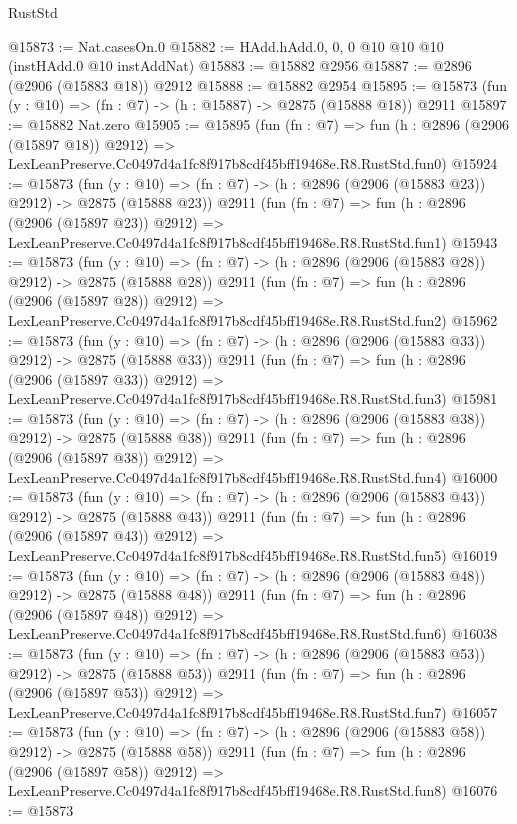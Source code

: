 \begin{lexlean}{RustStd}
\begin{coremodule}
@15873 := Nat.casesOn.{0}
@15882 := HAdd.hAdd.{0, 0, 0} @10 @10 @10 (instHAdd.{0} @10 instAddNat)
@15883 := @15882 @2956
@15887 := @2896 (@2906 (@15883 @18)) @2912
@15888 := @15882 @2954
@15895 := @15873 (fun (y : @10) => (fn : @7) -> (h : @15887) -> @2875 (@15888 @18)) @2911
@15897 := @15882 Nat.zero
@15905 := @15895
    (fun (fn : @7) =>
    fun (h : @2896 (@2906 (@15897 @18)) @2912) =>
    LexLeanPreserve.Cc0497d4a1fc8f917b8cdf45bff19468e.R8.RustStd.fun0)
@15924 := @15873
    (fun (y : @10) => (fn : @7) -> (h : @2896 (@2906 (@15883 @23)) @2912) -> @2875 (@15888 @23))
    @2911
    (fun (fn : @7) =>
    fun (h : @2896 (@2906 (@15897 @23)) @2912) =>
    LexLeanPreserve.Cc0497d4a1fc8f917b8cdf45bff19468e.R8.RustStd.fun1)
@15943 := @15873
    (fun (y : @10) => (fn : @7) -> (h : @2896 (@2906 (@15883 @28)) @2912) -> @2875 (@15888 @28))
    @2911
    (fun (fn : @7) =>
    fun (h : @2896 (@2906 (@15897 @28)) @2912) =>
    LexLeanPreserve.Cc0497d4a1fc8f917b8cdf45bff19468e.R8.RustStd.fun2)
@15962 := @15873
    (fun (y : @10) => (fn : @7) -> (h : @2896 (@2906 (@15883 @33)) @2912) -> @2875 (@15888 @33))
    @2911
    (fun (fn : @7) =>
    fun (h : @2896 (@2906 (@15897 @33)) @2912) =>
    LexLeanPreserve.Cc0497d4a1fc8f917b8cdf45bff19468e.R8.RustStd.fun3)
@15981 := @15873
    (fun (y : @10) => (fn : @7) -> (h : @2896 (@2906 (@15883 @38)) @2912) -> @2875 (@15888 @38))
    @2911
    (fun (fn : @7) =>
    fun (h : @2896 (@2906 (@15897 @38)) @2912) =>
    LexLeanPreserve.Cc0497d4a1fc8f917b8cdf45bff19468e.R8.RustStd.fun4)
@16000 := @15873
    (fun (y : @10) => (fn : @7) -> (h : @2896 (@2906 (@15883 @43)) @2912) -> @2875 (@15888 @43))
    @2911
    (fun (fn : @7) =>
    fun (h : @2896 (@2906 (@15897 @43)) @2912) =>
    LexLeanPreserve.Cc0497d4a1fc8f917b8cdf45bff19468e.R8.RustStd.fun5)
@16019 := @15873
    (fun (y : @10) => (fn : @7) -> (h : @2896 (@2906 (@15883 @48)) @2912) -> @2875 (@15888 @48))
    @2911
    (fun (fn : @7) =>
    fun (h : @2896 (@2906 (@15897 @48)) @2912) =>
    LexLeanPreserve.Cc0497d4a1fc8f917b8cdf45bff19468e.R8.RustStd.fun6)
@16038 := @15873
    (fun (y : @10) => (fn : @7) -> (h : @2896 (@2906 (@15883 @53)) @2912) -> @2875 (@15888 @53))
    @2911
    (fun (fn : @7) =>
    fun (h : @2896 (@2906 (@15897 @53)) @2912) =>
    LexLeanPreserve.Cc0497d4a1fc8f917b8cdf45bff19468e.R8.RustStd.fun7)
@16057 := @15873
    (fun (y : @10) => (fn : @7) -> (h : @2896 (@2906 (@15883 @58)) @2912) -> @2875 (@15888 @58))
    @2911
    (fun (fn : @7) =>
    fun (h : @2896 (@2906 (@15897 @58)) @2912) =>
    LexLeanPreserve.Cc0497d4a1fc8f917b8cdf45bff19468e.R8.RustStd.fun8)
@16076 := @15873

\end{coremodule}
\end{lexlean}
